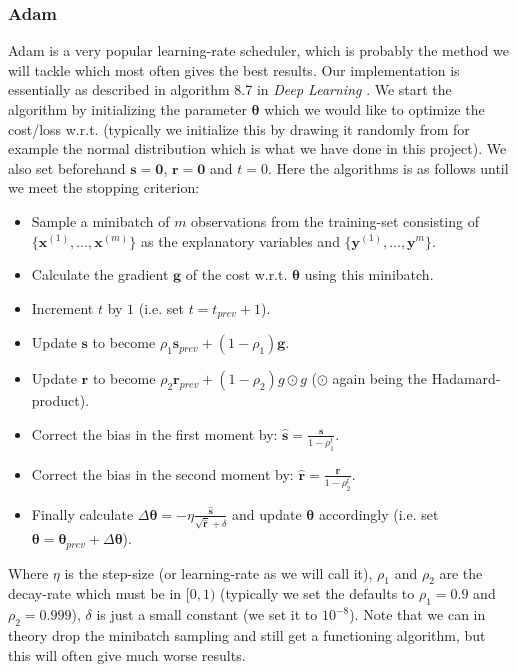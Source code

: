 \documentclass{article}
\begin{document}
\subsubsection{Adam}
Adam is a very popular learning-rate scheduler, which is probably the method we
will tackle which most often gives the best results. Our implementation is
essentially as described in algorithm 8.7 in \textit{Deep Learning}
\cite[s.~8.6.1]{goodfellow2016deep}. We start the algorithm by initializing the
parameter $\bm{\theta}$ which we would like to optimize the cost/loss w.r.t.
(typically we initialize this by drawing it randomly from for example the normal
distribution which is what we have done in this project). We also set beforehand
$\bm{s} = \bm{0}$, $\bm{r} = \bm{0}$ and $t=0$. Here the algorithms is as
follows until we meet the stopping criterion:
\begin{itemize}
      \item Sample a minibatch of $m$ observations from the training-set
            consisting of $\{\bm{x}^{(1)}, \dots, \bm{x}^{(m)}\}$ as the explanatory
            variables and $\{\bm{y}^{(1)}, \dots, \bm{y}^{m}\}$.
      \item Calculate the gradient $\bm{g}$ of the cost w.r.t. $\bm{\theta}$ using
            this minibatch.
      \item Increment $t$ by $1$ (i.e. set $t=t_{prev}+1$).
      \item Update $\bm{s}$ to become $\rho_1 \bm{s}_{prev} + (1 - \rho_1)\bm{g}$.
      \item Update $\bm{r}$ to become $\rho_2 \bm{r}_{prev} + (1 - \rho_2)g \odot
                  g$ ($\odot$ again being the Hadamard-product).
      \item Correct the bias in the first moment by: $\hat{\bm{s}} = \frac{\bm{s}}{1 - \rho_1^t}$.
      \item Correct the bias in the second moment by: $\hat{\bm{r}} = \frac{\bm{r}}{1 - \rho_2^t}$.
      \item Finally calculate $\Delta \bm{\theta} = -\eta
                  \frac{\hat{\bm{s}}}{\sqrt{\hat{\bm{r}}} + \delta}$ and update $\bm{\theta}$
            accordingly (i.e. set $\bm{\theta} = \bm{\theta}_{prev} + \Delta
                  \bm{\theta}$).
\end{itemize}
Where $\eta$ is the step-size (or learning-rate as we will call it), $\rho_1$
and $\rho_2$ are the decay-rate which must be in $[0, 1)$ (typically we set the
defaults to $\rho_1 = 0.9$ and $\rho_2 = 0.999$), $\delta$ is just a small
constant (we set it to $10^{-8}$). Note that we can in theory drop the minibatch
sampling and still get a functioning algorithm, but this will often give much
worse results.
\end{document}

